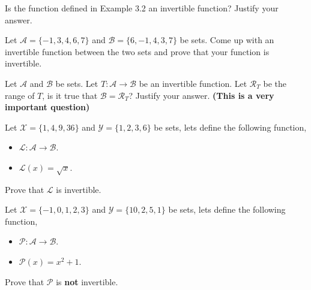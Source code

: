 \documentclass[12pt]{article} %
\begin{document}
\begin{qstn}
  Is the function defined in Example 3.2 an invertible function? Justify your answer.
\end{qstn}

\begin{qstn}
  Let $\mathcal{A} = \{-1,3,4,6,7\}$ and $\mathcal{B} = \{6,-1,4,3,7\} $ be sets. Come up with an invertible function between the
  two sets and prove that your function is invertible.
\end{qstn}

\begin{qstn}
  Let $\mathcal{A}$ and $\mathcal{B}$ be sets. Let $T \colon \mathcal{A} \to \mathcal{B}$ be an invertible function.
  Let $\mathcal{R}_T$ be the range of $T$, is it true that $\mathcal{B} = \mathcal{R}_T$? Justify your answer.
  \textbf{(This is a very important question)}
\end{qstn}

\begin{qstn}
  Let $ \mathcal{X} = \{1,4,9,36\} $ and $ \mathcal{Y} = \{1,2,3,6\} $ be sets, lets define the
  following function, 
  \begin{itemize}
    \item $\mathcal{L} \colon \mathcal{A} \to \mathcal{B}$.
    \item $\mathcal{L}(x) = \sqrt{x} $.
  \end{itemize}
  Prove that $\mathcal{L}$ is invertible.
\end{qstn}

\begin{qstn}
  Let $ \mathcal{X} = \{-1,0,1,2,3\} $ and $ \mathcal{Y} = \{10,2,5,1\} $ be sets, lets define the
  following function, 
  \begin{itemize}
    \item $\mathcal{P} \colon \mathcal{A} \to \mathcal{B}$.
    \item $\mathcal{P}(x) = x^2 +  1 $.
  \end{itemize}
  Prove that $\mathcal{P}$ is \textbf{not }invertible.
\end{qstn}
\end{document}
